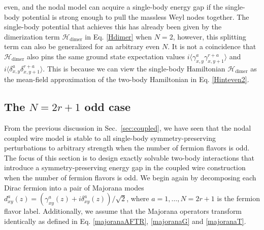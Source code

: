 even, and the nodal model can acquire a single-body energy gap if the single-body potential is strong enough to pull the massless Weyl nodes together. The single-body potential that achieves this has already been given by the dimerization term $\mathcal{H}_{\mathrm{dimer}}$ in Eq. \eqref{Hdimer} when $N=2$, however, this splitting term can also be generalized for an arbitrary even $N$. It is not a coincidence that $\mathcal{H}_{\mathrm{dimer}}$ also pins the same ground state expectation values $i\langle\gamma^a_{x,y}\gamma^{r+a}_{x,y+1}\rangle$ and $i\langle\delta^a_{x,y}\delta^{r+a}_{x,y+1}\rangle$. This is because we can view the single-body Hamiltonian $\mathcal{H}_{\mathrm{dimer}}$ as the mean-field approximation of the two-body Hamiltonian in Eq. \eqref{Hinteven2}.


\subsection{The \texorpdfstring{$N=2r+1$}{N=2r+1} odd case}\label{sec:SO3}
From the previous discussion in Sec.~\ref{sec:coupled}, we have seen that the nodal coupled wire model is stable to all single-body symmetry-preserving perturbations to arbitrary strength when the number of fermion flavors is odd. The focus of this section is to design exactly solvable two-body interactions that introduce a symmetry-preserving energy gap in the coupled wire construction when the number of fermion flavors is odd. We begin again by decomposing each Dirac fermion into a pair of Majorana modes $d^a_{xy}(z)=(\gamma^a_{xy}(z)+i\delta^a_{xy}(z))/\sqrt{2}$, where $a=1,\ldots,N=2r+1$ is the fermion flavor label. Additionally, we assume that the Majorana operators transform identically as defined in Eq. \eqref{majoranaAFTR}, \eqref{majoranaG} and \eqref{majoranaT}.

